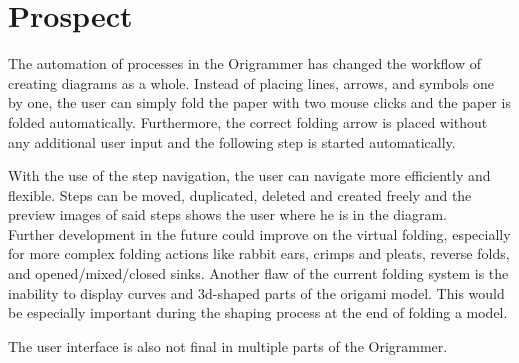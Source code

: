 
\section{Prospect}
\label{sec:prospect}

The automation of processes in the Origrammer has changed the workflow of creating diagrams as a whole. Instead of placing lines, arrows, and symbols one by one, the user can simply fold the paper with two mouse clicks and the paper is folded automatically. Furthermore, the correct folding arrow is placed without any additional user input and the following step is started automatically.

With the use of the step navigation, the user can navigate more efficiently and flexible. Steps can be moved, duplicated, deleted and created freely and the preview images of said steps shows the user where he is in the diagram.\\
\newline
Further development in the future could improve on the virtual folding, especially for more complex folding actions like rabbit ears, crimps and pleats, reverse folds, and opened/mixed/closed sinks. Another flaw of the current folding system is the inability to display curves and 3d-shaped parts of the origami model. This would be especially important during the shaping process at the end of folding a model.

The user interface is also not final in multiple parts of the Origrammer.